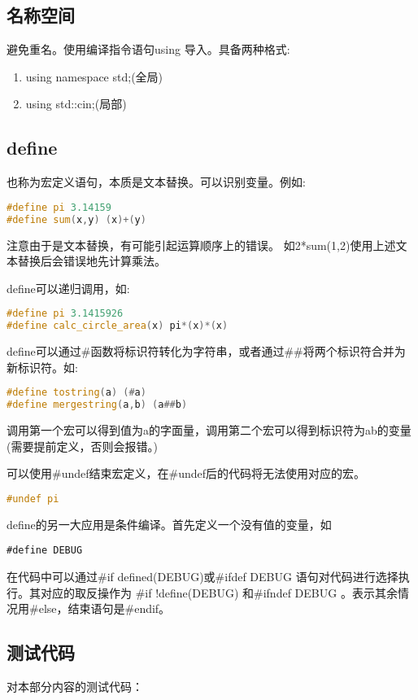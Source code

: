 \documentclass{article}
\begin{document}
    \subsection{名称空间}
    避免重名。使用编译指令语句using 导入。具备两种格式:
    \begin{enumerate}
        \item using namespace std;(全局)
        \item using std::cin;(局部)
    \end{enumerate}

    \subsection{define}
    也称为宏定义语句，本质是文本替换。可以识别变量。例如:
    \begin{lstlisting}[language=c++]
#define pi 3.14159
#define sum(x,y) (x)+(y)
    \end{lstlisting}
    注意由于是文本替换，有可能引起运算顺序上的错误。
    如2*sum(1,2)使用上述文本替换后会错误地先计算乘法。

    define可以递归调用，如:
    \begin{lstlisting}[language=c++]
#define pi 3.1415926
#define calc_circle_area(x) pi*(x)*(x)
    \end{lstlisting}
    

    define可以通过\#函数将标识符转化为字符串，或者通过\#\#将两个标识符合并为新标识符。如:
\begin{lstlisting}[language=c++]
#define tostring(a) (#a)
#define mergestring(a,b) (a##b) 
\end{lstlisting}
    调用第一个宏可以得到值为a的字面量，调用第二个宏可以得到标识符为ab的变量(需要提前定义，否则会报错。)

    可以使用\#undef结束宏定义，在\#undef后的代码将无法使用对应的宏。
    \begin{lstlisting}[language=c++]
#undef pi 
    \end{lstlisting}  

    define的另一大应用是条件编译。首先定义一个没有值的变量，如
    \begin{lstlisting}
#define DEBUG
    \end{lstlisting}
    在代码中可以通过\#if defined(DEBUG)或\#ifdef DEBUG 语句对代码进行选择执行。其对应的取反操作为
    \#if !define(DEBUG) 和\#ifndef DEBUG 。表示其余情况用\#else，结束语句是\#endif。

    \subsection{测试代码}
    对本部分内容的测试代码：
\end{document}
